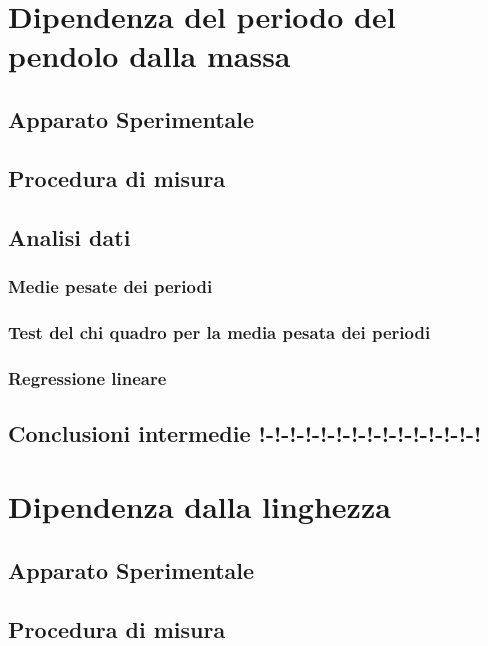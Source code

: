 \documentclass[11pt, twoside, a4paper]{article}
\begin{document}

\newpage

\newpage


\section{Dipendenza del periodo del pendolo dalla massa}
%
	\subsection{Apparato Sperimentale}
	
	\subsection{Procedura di misura}
	
	\subsection{Analisi dati}
	
		\subsubsection{Medie pesate dei periodi}
		
		\subsubsection{Test del chi quadro per la media pesata dei periodi}
		
		\subsubsection{Regressione lineare}
		
	\subsection{Conclusioni intermedie !-!-!-!-!-!-!-!-!-!-!-!-!-!-!}
	
\newpage
\section{Dipendenza dalla linghezza}
	\subsection{Apparato Sperimentale}
	
	\subsection{Procedura di misura}
	
\end{document}

